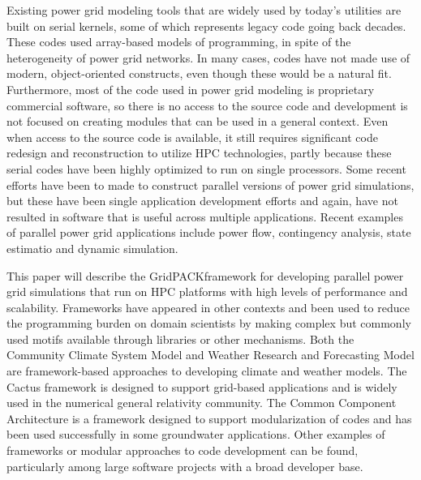 \documentclass[preprint]{acm_proc_article-sp}
\begin{document}
Existing power grid modeling tools that are widely used by today's utilities are
built on serial kernels, some of which represents legacy code going back decades.
These
codes used array-based models of programming, in spite of the heterogeneity of
power grid networks. In many cases, codes have not made use of modern,
object-oriented constructs, even though these
would be a natural fit. Furthermore, most of the code used in power grid
modeling is proprietary commercial software, so there is no access to the source
code and development is not focused on creating modules that can be used in a
general context. Even when access to the source code is available, it still
requires significant code redesign and reconstruction to utilize HPC
technologies, partly because these serial codes have been highly optimized to
run on single processors. Some recent efforts have been to made to construct
parallel versions of power grid simulations, but these have been single
application development efforts and again, have not resulted in software that is
useful across multiple applications. Recent examples of parallel power grid
applications include power flow\cite{LUO}, contingency
analysis\cite{HUANG,CHEN}, state estimatio\cite{FALCAO,CHEN} and dynamic
simulation\cite{JIN}.

This paper will describe the GridPACK\texttrademark framework for developing parallel
power grid simulations that run on HPC platforms with high levels of
performance and scalability. Frameworks have appeared in other contexts and been
used to reduce the programming burden on domain scientists by making complex
but commonly used motifs available through libraries or other mechanisms.
Both the Community Climate System Model\cite{CCSM} and Weather Research
and Forecasting Model\cite{WRF} are framework-based
approaches to developing climate and weather models. The Cactus framework is
designed to support grid-based applications and is widely used in the numerical
general relativity community\cite{CACTUS}. The Common Component
Architecture\cite{CCA} is a framework
designed to support modularization of codes and has been used successfully in
some groundwater applications\cite{SPH}. Other examples of frameworks or modular approaches
to code development can be found, particularly among large software projects
with a broad developer base.
\end{document}
